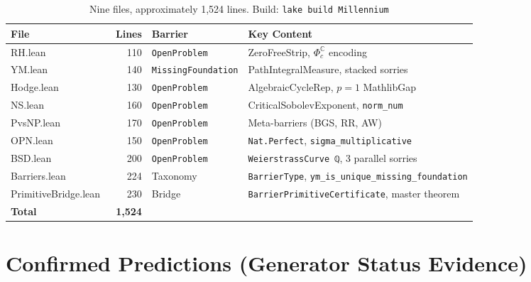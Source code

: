 \documentclass[11pt,a4paper]{article}
\begin{document}
\begin{table}[h!]
\centering
\caption{Nine files, approximately 1,524 lines. Build: \texttt{lake build Millennium}}
\label{tab:library}
\begin{tabular}{l r l l}
\toprule
\textbf{File} & \textbf{Lines} & \textbf{Barrier} & \textbf{Key Content} \\
\midrule
RH.lean & ~110 & \texttt{OpenProblem} & ZeroFreeStrip, $\Phi_c^\mathbb{C}$ encoding \\
YM.lean & ~140 & \texttt{MissingFoundation} & PathIntegralMeasure, stacked sorries \\
Hodge.lean & ~130 & \texttt{OpenProblem} & AlgebraicCycleRep, $p{=}1$ MathlibGap \\
NS.lean & ~160 & \texttt{OpenProblem} & CriticalSobolevExponent, \texttt{norm\_num} \\
PvsNP.lean & ~170 & \texttt{OpenProblem} & Meta-barriers (BGS, RR, AW) \\
OPN.lean & ~150 & \texttt{OpenProblem} & \texttt{Nat.Perfect}, \texttt{sigma\_multiplicative} \\
BSD.lean & ~200 & \texttt{OpenProblem} & \texttt{WeierstrassCurve ℚ}, 3 parallel sorries \\
Barriers.lean & ~224 & Taxonomy & \texttt{BarrierType}, \texttt{ym\_is\_unique\_missing\_foundation} \\
PrimitiveBridge.lean & ~230 & Bridge & \texttt{BarrierPrimitiveCertificate}, master theorem \\
\midrule
\textbf{Total} & \textbf{~1,524} & & \\
\bottomrule
\end{tabular}
\end{table}

\section{Confirmed Predictions (Generator Status Evidence)}
\end{document}
